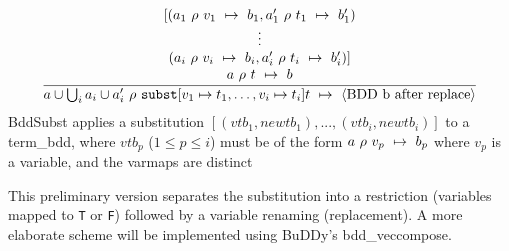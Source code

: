 \bigskip 

\noindent \newsavebox\BddApRestrict
\begin{lrbox}\BddApRestrict
{}
\end{lrbox}             
\fbox{\usebox{\BddApRestrict}}

\bigskip 

\noindent \newsavebox\BddSubst
\begin{lrbox}\BddSubst
{}
{\[\frac{\begin{array}{c}
         [(\mbox{$a_1~\rho~v_1~\mapsto~b_1$},\mbox{$a_1'~\rho~t_1~\mapsto~b_1'$}) \\
         \vdots\\
         (\mbox{$a_i~\rho~v_i~\mapsto~b_i$},\mbox{$a_i'~\rho~t_i~\mapsto~b_i'$})] \\
         \mbox{$a~\rho~t~\mapsto~b$} \\
         \end{array}}
        {\mbox{$a\cup\bigcup_i {a_i\cup a_i'}~\rho~\mathtt{subst} [v_1\mapsto t_1,\ldots,v_i\mapsto t_i] t~\mapsto~\langle\textup{BDD b after replace}\rangle$}}\]
 BddSubst applies a substitution $[(vtb_1,newtb_1),...,(vtb_i,newtb_i)]$
 to a term\_bdd, where $vtb_p$ ($1 \leq p \leq i$) must be of the form            
 $\mbox{$a~\rho~v_p~\mapsto~b_p$}$ where $v_p$ is a variable, and the varmaps are distinct   
                                                                          
 This preliminary version separates the substitution into a          
 restriction (variables mapped to \texttt{T} or \texttt{F}) followed by a variable          
 renaming (replacement).  A more elaborate scheme will be implemented     
 using BuDDy's bdd\_veccompose.}
\end{lrbox}             
\fbox{\usebox{\BddSubst}}

\bigskip 

\noindent \newsavebox\BddApSubst
\begin{lrbox}\BddApSubst
{}
\end{lrbox}             
\fbox{\usebox{\BddApSubst}}

